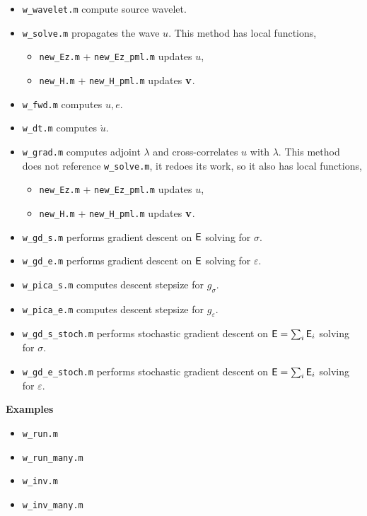 \documentclass[a4paper,12pt]{article}
\begin{document}
\begin{itemize}
\item \texttt{w\_wavelet.m} compute source wavelet.
\item \texttt{w\_solve.m} propagates the wave $u$. This method has local functions,
\begin{itemize}
\item \texttt{new\_Ez.m} + \texttt{new\_Ez\_pml.m} updates $u$,
\item \texttt{new\_H.m} + \texttt{new\_H\_pml.m} updates ${\bf v}$.
\end{itemize}
\item \texttt{w\_fwd.m} computes $u,e$.
\item \texttt{w\_dt.m} computes $\dot{u}$.
\item \texttt{w\_grad.m} computes adjoint $\lambda$ and cross-correlates $u$ with $\lambda$. 
This method does not reference \texttt{w\_solve.m}, it redoes its work, so it also has local functions,
\begin{itemize}
\item \texttt{new\_Ez.m} + \texttt{new\_Ez\_pml.m} updates $u$,
\item \texttt{new\_H.m} + \texttt{new\_H\_pml.m} updates ${\bf v}$.
\end{itemize}
\item \texttt{w\_gd\_s.m} performs gradient descent on ${\sf E}$ solving for $\sigma$.
\item \texttt{w\_gd\_e.m} performs gradient descent on ${\sf E}$ solving for $\varepsilon$.
\item \texttt{w\_pica\_s.m} computes descent stepsize for $g_\sigma$.
\item \texttt{w\_pica\_e.m} computes descent stepsize for $g_\varepsilon$.
\item \texttt{w\_gd\_s\_stoch.m} performs stochastic gradient descent on ${\sf E} = \sum_i{\sf E}_i$ solving for $\sigma$.
\item \texttt{w\_gd\_e\_stoch.m} performs stochastic gradient descent on ${\sf E} = \sum_i{\sf E}_i$ solving for $\varepsilon$.
\end{itemize}
{\bf Examples}
\begin{itemize}
 \item \texttt{w\_run.m}
\item \texttt{w\_run\_many.m}
\item \texttt{w\_inv.m}
\item \texttt{w\_inv\_many.m}
\end{itemize}

%
%
\end{document}
